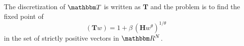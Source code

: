 \documentclass[12pt, reqno]{amsart}
\newcommand{\1}{\mathbbm 1}
\newcommand{\RR}{\mathbbm R}
\newcommand{\TT}{\mathbbm T}
\newcommand{\bH}{\mathbf H}
\newcommand{\bT}{\mathbf T}
\theoremstyle{plain}
\theoremstyle{definition}
\begin{document}
The discretization of $\TT$ is written as $\bT$ and the problem is to find the
fixed point of 
%
\begin{equation}\label{eq:wcopd}
    (\bT w) = 1 + \beta \,  (\bH w^\theta)^{1/\theta}
\end{equation}
%
in the set of strictly positive vectors in $\RR^N$.








\end{document}
